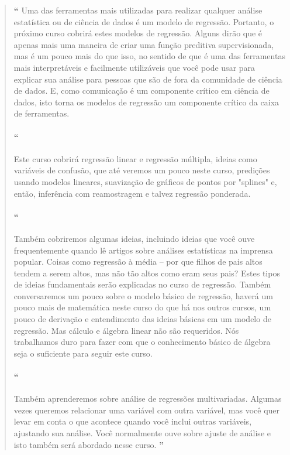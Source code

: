 \begin{quotation}%
\begin{small}
{\large\textbf{``}}%
Uma das ferramentas mais utilizadas para realizar  qualquer análise estatística ou de ciência de dados é um modelo de regressão. Portanto, o próximo curso cobrirá estes modelos de regressão. Alguns dirão que é apenas mais uma maneira de criar uma função preditiva supervisionada, mas é um pouco mais do que isso, no sentido de que é uma das ferramentas mais interpretáveis e facilmente utilizáveis  que você pode usar para explicar sua análise para pessoas que são de fora da comunidade de ciência de dados. E, como comunicação é um componente crítico em ciência de dados, isto torna os modelos de regressão um componente crítico da caixa de ferramentas. 

\paragraph{``}
Este curso cobrirá regressão linear e regressão múltipla, ideias como variáveis de confusão,  que até veremos um pouco neste curso, predições usando modelos lineares, suavização de gráficos de pontos por "splines" e, então, inferência com reamostragem e talvez regressão ponderada.

\paragraph{``}
Também cobriremos algumas ideias, incluindo ideias que você ouve frequentemente quando lê artigos sobre análises estatísticas na imprensa popular. Coisas como regressão à média – por que filhos de pais altos tendem a serem altos, mas não tão altos como eram seus pais? Estes tipos de ideias fundamentais serão explicadas no curso de regressão. Também conversaremos um pouco sobre o modelo básico de regressão, haverá um pouco mais de matemática neste curso do que há nos outros cursos,  um pouco de derivação e entendimento das ideias básicas em um modelo de regressão. Mas cálculo e álgebra linear não são requeridos. Nós trabalhamos duro para fazer com que o conhecimento básico de álgebra seja o suficiente para seguir este curso. 

\paragraph{``}
Também aprenderemos sobre análise de regressões multivariadas. Algumas vezes queremos relacionar uma variável com outra variável, mas você quer levar em conta o que acontece quando você inclui outras variáveis, ajustando sua análise. Você normalmente ouve sobre ajuste de análise e isto também será abordado nesse curso. 
{\large\textbf{''}}
\end{small}
\end{quotation}


